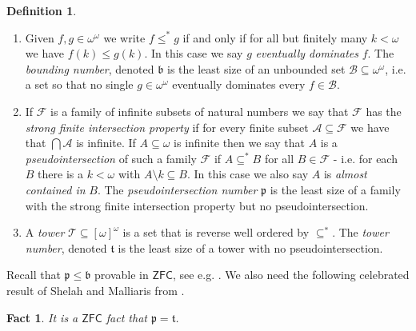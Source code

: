 \documentclass[leqno,11pt]{amsart}
\newtheorem{fact}[theorem]{Fact}
\theoremstyle{definition}
\newtheorem{definition}[theorem]{Definition}
\theoremstyle{remark}
\def\Null{\mathcal N}
\def\ZFC{\mathsf{ZFC}}
\def\baire{\omega^\omega}
\def\cantor{2^\omega}
\def\mfb{\mathfrak b}
\def\mfp{\mathfrak{p}}
\def\add{{\rm add}}
\begin{document}
\begin{definition}
    \begin{enumerate}

        \item Given $f, g \in \baire$ we write $f\leq^*g$ if and only if for all but finitely many $k < \omega$ we have $f(k) \leq g(k)$. In this case we say $g$ {\em eventually dominates} $f$. The {\em bounding number}, denoted $\mfb$ is the least size of an unbounded set $\mathcal B \subseteq \baire$, i.e. a set so that no single $g\in \baire$ eventually dominates every $f \in \mathcal B$.         

        \item If $\mathcal F$ is a family of infinite subsets of natural numbers we say that $\mathcal F$ has the {\em strong finite intersection property} if for every finite subset $\mathcal A \subseteq \mathcal F$ we have that $\bigcap \mathcal A$ is infinite. If $A \subseteq \omega$ is infinite then we say that $A$ is a {\em pseudointersection} of such a family $\mathcal F$ if $A \subseteq^* B$ for all $B \in \mathcal F$ - i.e. for each $B$ there is a $k < \omega$ with $A \setminus k \subseteq B$. In this case we also say $A$ is {\em almost contained in} $B$. The {\em pseudointersection number} $\mfp$ is the least size of a family with the strong finite intersection property but no pseudointersection. 

        \item A {\em tower} $\mathcal T \subseteq [\omega]^\omega$ is a set that is reverse well ordered by $\subseteq^*$. The {\em tower number}, denoted $\mathfrak{t}$ is the least size of a tower with no pseudointersection.
    \end{enumerate}
\end{definition}

Recall that $\mfp \leq \mfb$ provable in $\ZFC$, see e.g. \cite{BlassHB}. We also need the following celebrated result of Shelah and Malliaris from \cite{p=t}. %

\begin{fact}
    It is a $\ZFC$ fact that $\mfp = \mathfrak{t}$.
\end{fact}
\end{document}
